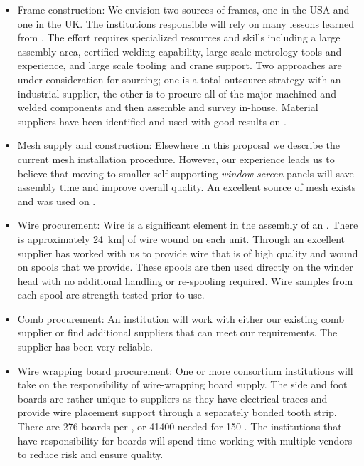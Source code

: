 \begin{itemize}

\item Frame construction: We envision two sources of frames, one in the USA and one in the UK. The institutions responsible will rely on many lessons learned from . The effort requires specialized resources and skills including a large assembly area, certified welding capability, large scale metrology tools and experience, and large scale tooling and crane support. Two approaches are under consideration for sourcing; one is a total outsource strategy with an industrial supplier, the other is to procure all of the major machined and welded components and then assemble and survey in-house. Material suppliers have been identified and used with good results on .

\item Mesh supply and construction: Elsewhere in this proposal we describe the current mesh installation procedure. However, our  experience leads us to believe that moving to smaller self-supporting \textit{window screen} panels will save assembly time and improve overall  quality. An excellent source of mesh exists and was used on .

\item Wire procurement: Wire is a significant element in the assembly of an . There is approximately \SI{24}{km}| of wire wound on each unit. Through  %
an excellent supplier %
has worked with us to provide wire that is of high quality and wound on spools that we provide. These spools are then used directly on the winder head with no additional handling or re-spooling required. Wire samples from each spool are strength tested prior to use.

\item Comb procurement: An institution will work with either our existing comb supplier or find additional suppliers that can meet our requirements. The  supplier has been very reliable.

\item Wire wrapping board procurement: One or more consortium institutions will take on the responsibility of wire-wrapping board supply. The side and foot boards are rather unique to suppliers as they have electrical traces and provide wire placement support through a separately bonded tooth strip. There are \num{276} boards per , or \num{41400} needed for \num{150} . The institutions that have responsibility for boards will spend time working with multiple vendors to reduce risk and ensure quality. 


\end{itemize}
